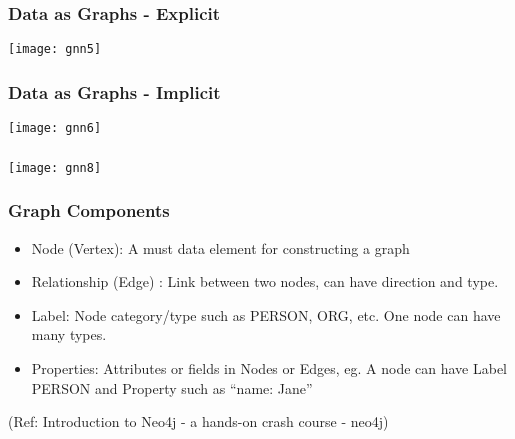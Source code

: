 \begin{frame}[fragile]\frametitle{Data as Graphs - Explicit }

\begin{center}
\texttt{[image: gnn5]}
\end{center}	  

\end{frame}

\begin{frame}[fragile]\frametitle{Data as Graphs - Implicit }

\begin{center}
\texttt{[image: gnn6]}
\end{center}	  

\end{frame}



\begin{frame}[fragile]\frametitle{}

\begin{center}
\texttt{[image: gnn8]}
\end{center}	  

\end{frame}


\begin{frame}\frametitle{Graph Components}

\begin{itemize}
\item Node (Vertex): A must data element for constructing a graph
\item Relationship (Edge) : Link between two nodes, can have direction and type.
\item Label: Node category/type such as PERSON, ORG, etc. One node can have many types.
\item Properties: Attributes or fields in Nodes or Edges, eg. A node can have Label PERSON and Property such as ``name: Jane''
\end{itemize}



{\tiny (Ref: Introduction to Neo4j - a hands-on crash course - neo4j)}
\end{frame}


